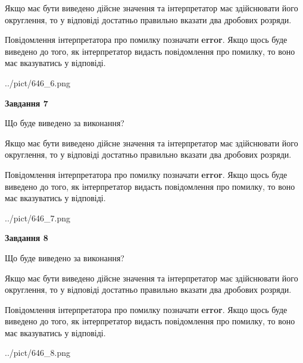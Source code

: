 \documentclass[12pt, ukrainian]{article}
\begin{document}
{\begin {Large}
Якщо має бути виведено дійсне значення та інтерпретатор має здійснювати його округлення, 
то у відповіді достатньо правильно вказати два дробових розряди.

Повідомлення інтерпретатора про помилку позначати \textbf{error}.
Якщо щось буде виведено до того, як інтерпретатор видасть повідомлення про помилку, 
то воно має вказуватись у відповіді. \par

\begin{center}
	{../pict/646_6.png}
\end{center}
\newpage

{\begin {center}\textbf{Завдання 7}\end {center}}\par
Що буде виведено за виконання? \par

Якщо має бути виведено дійсне значення та інтерпретатор має здійснювати його округлення, 
то у відповіді достатньо правильно вказати два дробових розряди.

Повідомлення інтерпретатора про помилку позначати \textbf{error}.
Якщо щось буде виведено до того, як інтерпретатор видасть повідомлення про помилку, 
то воно має вказуватись у відповіді. \par

\begin{center}
	{../pict/646_7.png}
\end{center}
\newpage

{\begin {center}\textbf{Завдання 8}\end {center}}\par
Що буде виведено за виконання? \par

Якщо має бути виведено дійсне значення та інтерпретатор має здійснювати його округлення, 
то у відповіді достатньо правильно вказати два дробових розряди.

Повідомлення інтерпретатора про помилку позначати \textbf{error}.
Якщо щось буде виведено до того, як інтерпретатор видасть повідомлення про помилку, 
то воно має вказуватись у відповіді. \par

\begin{center}
	{../pict/646_8.png}
\end{center}
\newpage


\end{Large}}
\end{document}

